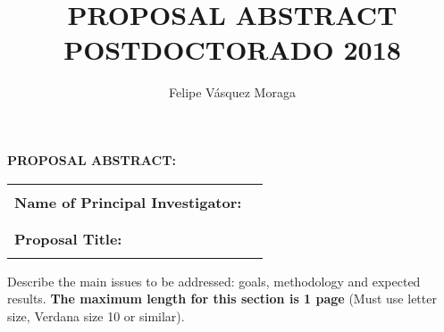 ﻿\documentclass[10pt]{article}
\author{Felipe Vásquez Moraga}
\title{PROPOSAL ABSTRACT POSTDOCTORADO 2018}
\begin{document}
\noindent \textbf{PROPOSAL ABSTRACT: }

\noindent \textbf{}

\begin{tabular}{|p{2.3in}|p{4.7in}|}
\hline
\parbox{2.3in}{\centering }
& \parbox{4.7in} {\centering }  \\

\parbox{2.3in} {\raggedright \textbf{Name of Principal Investigator:} }
& \parbox{4.7in} {\centering }  \\ 

\parbox{2.3in}{\centering }
& \parbox{4.7in} {\centering }  \\
\hline 
\parbox{2.3in}{\centering }
& \parbox{4.7in} {\centering }  \\
\parbox{2.3in} {\raggedright\textbf{Proposal Title:} }
& \parbox{4.7in} {\centering }  \\
\parbox{2.3in}{\centering }
& \parbox{4.7in} {\centering }  \\
\hline 
\end{tabular}

\vspace{15pt}
\noindent Describe the main issues to be addressed: goals, methodology and expected results. \textbf{The maximum length for this section is 1 page }(Must use letter size, Verdana size 10 or similar).
\end{document}
